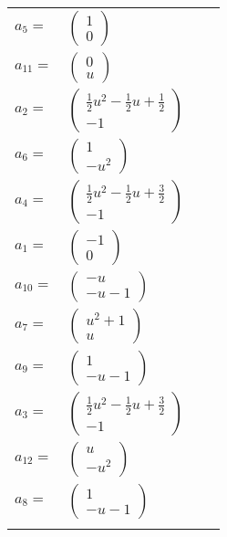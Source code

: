\documentclass[1p]{elsarticle_modified}
\theoremstyle{definition}
\begin{document}
\begin{tabular}{m{7pt} m{180pt} m{7pt} m{180pt} }
\flushright $a_{5}=$&$\begin{pmatrix}1\\0\end{pmatrix}$ \\
\flushright $a_{11}=$&$\begin{pmatrix}0\\u\end{pmatrix}$ \\
\flushright $a_{2}=$&$\begin{pmatrix}\frac{1}{2} u^2-\frac{1}{2} u+\frac{1}{2}\\-1\end{pmatrix}$ \\
\flushright $a_{6}=$&$\begin{pmatrix}1\\- u^2\end{pmatrix}$ \\
\flushright $a_{4}=$&$\begin{pmatrix}\frac{1}{2} u^2-\frac{1}{2} u+\frac{3}{2}\\-1\end{pmatrix}$ \\
\flushright $a_{1}=$&$\begin{pmatrix}-1\\0\end{pmatrix}$ \\
\flushright $a_{10}=$&$\begin{pmatrix}- u\\- u-1\end{pmatrix}$ \\
\flushright $a_{7}=$&$\begin{pmatrix}u^2+1\\u\end{pmatrix}$ \\
\flushright $a_{9}=$&$\begin{pmatrix}1\\- u-1\end{pmatrix}$ \\
\flushright $a_{3}=$&$\begin{pmatrix}\frac{1}{2} u^2-\frac{1}{2} u+\frac{3}{2}\\-1\end{pmatrix}$ \\
\flushright $a_{12}=$&$\begin{pmatrix}u\\- u^2\end{pmatrix}$ \\
\flushright $a_{8}=$&$\begin{pmatrix}1\\- u-1\end{pmatrix}$\\&\end{tabular}
\end{document}
